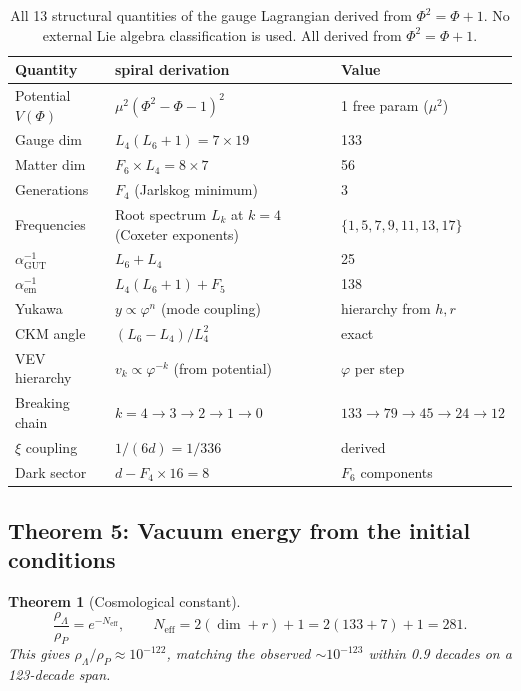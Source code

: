 \documentclass[12pt,a4paper]{article}
\newtheorem{theorem}{Theorem}[section]
\begin{document}
\begin{table}[h!]
\centering
\small
\begin{tabular}{|l|l|l|}
\hline
\textbf{Quantity} & \textbf{spiral derivation} & \textbf{Value} \\
\hline
Potential $V(\Phi)$ & $\mu^2(\Phi^2{-}\Phi{-}1)^2$ & 1 free param ($\mu^2$) \\
Gauge dim & $L_4(L_6{+}1) = 7 \times 19$ & 133 \\
Matter dim & $F_6 \times L_4 = 8 \times 7$ & 56 \\
Generations & $F_4$ (Jarlskog minimum) & 3 \\
Frequencies & Root spectrum $L_k$ at $k = 4$ (Coxeter exponents) & $\{1,5,7,9,11,13,17\}$ \\
$\alpha_{\mathrm{GUT}}^{-1}$ & $L_6 + L_4$ & 25 \\
$\alpha_{\mathrm{em}}^{-1}$ & $L_4(L_6{+}1) + F_5$ & 138 \\
Yukawa & $y \propto \varphi^{n}$ (mode coupling) & hierarchy from $h, r$ \\
CKM angle & $(L_6{-}L_4)/L_4^2$ & exact \\
VEV hierarchy & $v_k \propto \varphi^{-k}$ (from potential) & $\varphi$ per step \\
Breaking chain & $k = 4 \to 3 \to 2 \to 1 \to 0$ & $133 \to 79 \to 45 \to 24 \to 12$ \\
$\xi$ coupling & $1/(6d) = 1/336$ & derived \\
Dark sector & $d - F_4 \times 16 = 8$ & $F_6$ components \\
\hline
\end{tabular}
\caption{All 13 structural quantities of the gauge Lagrangian derived from $\Phi^2 = \Phi + 1$. No external Lie algebra classification is used. All derived from $\Phi^2 = \Phi + 1$.}
\label{tab:spiral-summary}
\end{table}



\subsection{Theorem 5: Vacuum energy from the initial conditions}
\label{sec:vacuum-energy}

\begin{theorem}[Cosmological constant]
\begin{equation}
\frac{\rho_\Lambda}{\rho_P} = e^{-N_{\mathrm{eff}}}, \qquad N_{\mathrm{eff}} = 2(\dim + r) + 1 = 2(133 + 7) + 1 = 281.
\end{equation}
This gives $\rho_\Lambda/\rho_P \approx 10^{-122}$, matching the observed $\sim 10^{-123}$ within 0.9 decades on a 123-decade span.
\end{theorem}
\end{document}
